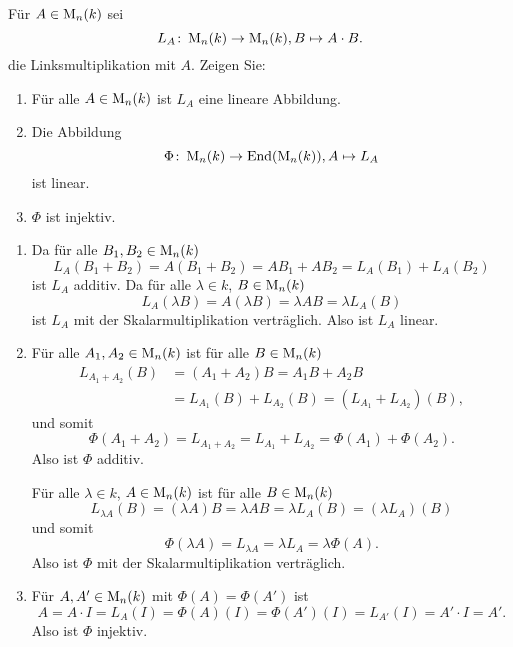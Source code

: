 

\begin{question}
 Für $A \in \operatorname{M}_n(k)$ sei
 \[
  L_A \colon \operatorname{M}_n(k) \rightarrow \operatorname{M}_n(k), B \mapsto A \cdot B.
 \]
 die Linksmultiplikation mit $A$. Zeigen Sie:
 \begin{enumerate}
  \item
   Für alle $A \in \operatorname{M}_n(k)$ ist $L_A$ eine lineare Abbildung.
  \item
   Die Abbildung
   \[
    \Phi \colon \operatorname{M}_n(k) \rightarrow \operatorname{End}(\operatorname{M}_n(k)), A \mapsto L_A
   \]
   ist linear.
  \item
   $\Phi$ ist injektiv.
 \end{enumerate}
\end{question}
\begin{solution}
 \begin{enumerate}
  \item
   Da für alle $B_1, B_2 \in \operatorname{M}_n(k)$
   \[
    L_A(B_1 + B_2) = A (B_1 + B_2) = A B_1 + A B_2 = L_A(B_1) + L_A(B_2)
   \]
   ist $L_A$ additiv. Da für alle $\lambda \in k$, $B \in \operatorname{M}_n(k)$
   \[
    L_A(\lambda B) = A(\lambda B) = \lambda A B = \lambda L_A(B)
   \]
   ist $L_A$ mit der Skalarmultiplikation verträglich. Also ist $L_A$ linear.
  \item
   Für alle $A_1, A_2 \in \operatorname{M}_n(k)$ ist für alle $B \in \operatorname{M}_n(k)$
   \begin{align*}
    L_{A_1 + A_2}(B)
    &= (A_1 + A_2) B
    = A_1 B + A_2 B \\
    &= L_{A_1}(B) + L_{A_2}(B)
    = (L_{A_1} + L_{A_2})(B),
   \end{align*}
   und somit
   \[
    \Phi(A_1 + A_2) = L_{A_1 + A_2} = L_{A_1} + L_{A_2} = \Phi(A_1) + \Phi(A_2).
   \]
   Also ist $\Phi$ additiv.
   
   Für alle $\lambda \in k$, $A \in \operatorname{M}_n(k)$ ist für alle $B \in \operatorname{M}_n(k)$
   \[
    L_{\lambda A}(B) = (\lambda A) B = \lambda A B = \lambda L_A(B) = (\lambda L_A)(B)
   \]
   und somit
   \[
    \Phi(\lambda A) = L_{\lambda A} = \lambda L_A = \lambda \Phi(A).
   \]
   Also ist $\Phi$ mit der Skalarmultiplikation verträglich.
  \item
   Für $A, A' \in \operatorname{M}_n(k)$ mit $\Phi(A) = \Phi(A')$ ist
   \[
    A = A \cdot I = L_A(I) = \Phi(A)(I) = \Phi(A')(I) = L_{A'}(I) = A' \cdot I = A'.
   \]
   Also ist $\Phi$ injektiv.
 \end{enumerate}
\end{solution}



